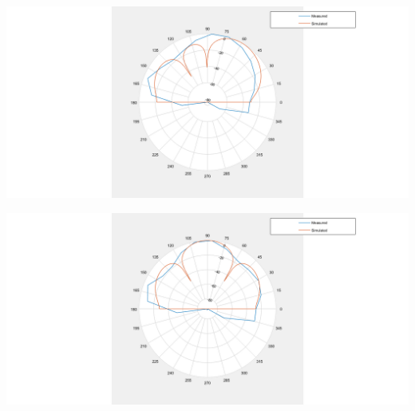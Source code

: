 \documentclass[landscape,a1paper,fontscale=0.45]{baposter} %
\begin{document}
\begin{poster}
{\begin{multicols}{2}
\begin{center}
	\includegraphics[width=0.8\linewidth]{deg60hardware.png}
\end{center}

\end{multicols}

\begin{multicols}{2}
	\vspace{1em}
	
	\begin{center}
		\includegraphics[width=0.8\linewidth]{deg90hardware.png}
	\end{center}

	
\end{multicols}
}



\end{poster}
\end{document}
